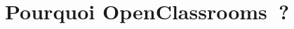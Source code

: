 \documentclass[8pt,xcolor=pdftex,table]{beamer}
\begin{document}



\section{Pourquoi OpenClassrooms~?}
\end{document}

